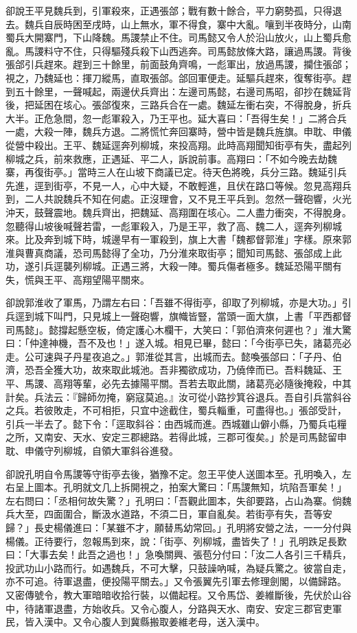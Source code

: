 卻說王平見魏兵到，引軍殺來，正遇張郃；戰有數十餘合，平力窮勢孤，只得退去。魏兵自辰時困至戌時，山上無水，軍不得食，寨中大亂。嚷到半夜時分，山南蜀兵大開寨門，下山降魏。馬謖禁止不住。司馬懿又令人於沿山放火，山上蜀兵愈亂。馬謖料守不住，只得驅殘兵殺下山西逃奔。司馬懿放條大路，讓過馬謖。背後張郃引兵趕來。趕到三十餘里，前面鼓角齊鳴，一彪軍出，放過馬謖，攔住張郃；視之，乃魏延也：揮刀縱馬，直取張郃。郃回軍便走。延驅兵趕來，復奪街亭。趕到五十餘里，一聲喊起，兩邊伏兵齊出：左邊司馬懿，右邊司馬昭，卻抄在魏延背後，把延困在垓心。張郃復來，三路兵合在一處。魏延左衝右突，不得脫身，折兵大半。正危急間，忽一彪軍殺入，乃王平也。延大喜曰：「吾得生矣！」二將合兵一處，大殺一陣，魏兵方退。二將慌忙奔回寨時，營中皆是魏兵旌旗。申耽、申儀從營中殺出。王平、魏延逕奔列柳城，來投高翔。此時高翔聞知街亭有失，盡起列柳城之兵，前來救應，正遇延、平二人，訴說前事。高翔曰：「不如今晚去劫魏寨，再復街亭。」當時三人在山坡下商議已定。待天色將晚，兵分三路。魏延引兵先進，逕到街亭，不見一人，心中大疑，不敢輕進，且伏在路口等候。忽見高翔兵到，二人共說魏兵不知在何處。正沒理會，又不見王平兵到。忽然一聲砲響，火光沖天，鼓聲震地。魏兵齊出，把魏延、高翔圍在垓心。二人盡力衝突，不得脫身。忽聽得山坡後喊聲若雷，一彪軍殺入，乃是王平，救了高、魏二人，逕奔列柳城來。比及奔到城下時，城邊早有一軍殺到，旗上大書「魏都督郭淮」字樣。原來郭淮與曹真商議，恐司馬懿得了全功，乃分淮來取街亭；聞知司馬懿、張郃成上此功，遂引兵逕襲列柳城。正遇三將，大殺一陣。蜀兵傷者極多。魏延恐陽平關有失，慌與王平、高翔望陽平關來。

卻說郭淮收了軍馬，乃謂左右曰：「吾雖不得街亭，卻取了列柳城，亦是大功。」引兵逕到城下叫門，只見城上一聲砲響，旗幟皆豎，當頭一面大旗，上書「平西都督司馬懿」。懿撐起懸空板，倚定護心木欄干，大笑曰：「郭伯濟來何遲也？」淮大驚曰：「仲達神機，吾不及也！」遂入城。相見已畢，懿曰：「今街亭已失，諸葛亮必走。公可速與子丹星夜追之。」郭淮從其言，出城而去。懿喚張郃曰：「子丹、伯濟，恐吾全獲大功，故來取此城池。吾非獨欲成功，乃僥倖而已。吾料魏延、王平、馬謖、高翔等輩，必先去據陽平關。吾若去取此關，諸葛亮必隨後掩殺，中其計矣。兵法云：『歸師勿掩，窮寇莫追。』汝可從小路抄箕谷退兵。吾自引兵當斜谷之兵。若彼敗走，不可相拒，只宜中途截住，蜀兵輜重，可盡得也。」張郃受計，引兵一半去了。懿下令：「逕取斜谷：由西城而進。西城雖山僻小縣，乃蜀兵屯糧之所，又南安、天水、安定三郡總路。若得此城，三郡可復矣。」於是司馬懿留申耽、申儀守列柳城，自領大軍斜谷進發。

卻說孔明自令馬謖等守街亭去後，猶豫不定。忽王平使人送圖本至。孔明喚入，左右呈上圖本。孔明就文几上拆開視之，拍案大驚曰：「馬謖無知，坑陷吾軍矣！」左右問曰：「丞相何故失驚？」孔明曰：「吾觀此圖本，失卻要路，占山為寨。倘魏兵大至，四面圍合，斷汲水道路，不須二日，軍自亂矣。若街亭有失，吾等安歸？」長史楊儀進曰：「某雖不才，願替馬幼常回。」孔明將安營之法，一一分付與楊儀。正待要行，忽報馬到來，說：「街亭、列柳城，盡皆失了！」孔明跌足長歎曰：「大事去矣！此吾之過也！」急喚關興、張苞分付曰：「汝二人各引三千精兵，投武功山小路而行。如遇魏兵，不可大擊，只鼓譟吶喊，為疑兵驚之。彼當自走，亦不可追。待軍退盡，便投陽平關去。」又令張翼先引軍去修理劍閣，以備歸路。又密傳號令，教大軍暗暗收拾行裝，以備起程。又令馬岱、姜維斷後，先伏於山谷中，待諸軍退盡，方始收兵。又令心腹人，分路與天水、南安、安定三郡官吏軍民，皆入漢中。又令心腹人到冀縣搬取姜維老母，送入漢中。

